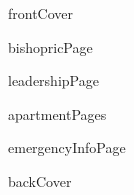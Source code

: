 \documentclass[12pt]{article}
\begin{document}
{{frontCover}}

\pagebreak

{{bishopricPage}}

\pagebreak

{{leadershipPage}}

\pagebreak

{{apartmentPages}}

{{emergencyInfoPage}}

\pagebreak

{{backCover}}
\end{document}
